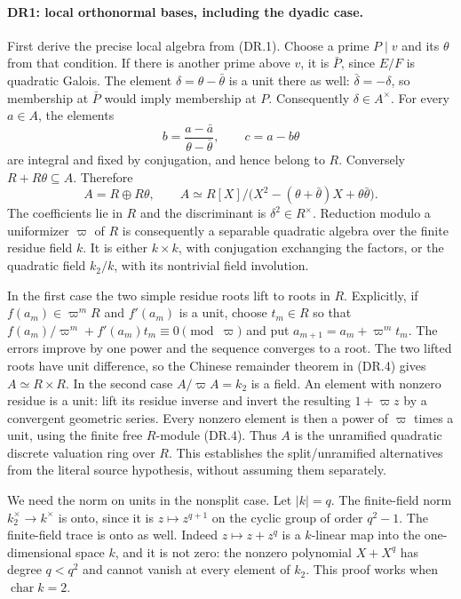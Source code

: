 \paragraph{DR1: local orthonormal bases, including the dyadic case.}
First derive the precise local algebra from (DR.1). Choose a prime
$P\mid v$ and its $\theta$ from that condition. If there is another
prime above $v$, it is $\bar P$, since $E/F$ is quadratic Galois.
The element $\delta=\theta-\bar\theta$ is a unit there as well:
$\bar\delta=-\delta$, so membership at $\bar P$ would imply
membership at $P$. Consequently $\delta\in A^\times$.
For every $a\in A$, the elements
\[
 b=\frac{a-\bar a}{\theta-\bar\theta},\qquad
 c=a-b\theta                                             \tag{DR.3}
\]
are integral and fixed by conjugation, and hence belong to $R$.
Conversely $R+R\theta\subseteq A$. Therefore
\[
 A=R\oplus R\theta,
 \qquad A\simeq R[X]/\bigl(X^2-(\theta+\bar\theta)X
                                  +\theta\bar\theta\bigr).
 \tag{DR.4}
\]
The coefficients lie in $R$ and the discriminant is
$\delta^2\in R^\times$. Reduction modulo a uniformizer $\varpi$
of $R$ is consequently a separable quadratic algebra over the finite
residue field $k$. It is either $k\times k$, with conjugation
exchanging the factors, or the quadratic field $k_2/k$, with its
nontrivial field involution.

In the first case the two simple residue roots lift to roots in $R$.
Explicitly, if $f(a_m)\in\varpi^mR$ and $f'(a_m)$ is a unit, choose
$t_m\in R$ so that
$f(a_m)/\varpi^m+f'(a_m)t_m\equiv0\pmod\varpi$ and put
$a_{m+1}=a_m+\varpi^m t_m$. The errors improve by one power and
the sequence converges to a root. The two lifted roots have unit
difference, so the Chinese remainder theorem in (DR.4) gives
$A\simeq R\times R$. In the second case $A/\varpi A=k_2$ is a
field. An element with nonzero residue is a unit: lift its residue
inverse and invert the resulting $1+\varpi z$ by a convergent
geometric series. Every nonzero element is then a power of
$\varpi$ times a unit, using the finite free $R$-module (DR.4).
Thus $A$ is the unramified quadratic discrete valuation ring over $R$.
This establishes the split/unramified alternatives from the literal
source hypothesis, without assuming them separately.

We need the norm on units in the nonsplit case. Let $|k|=q$.
The finite-field norm $k_2^\times\to k^\times$ is onto, since
it is $z\mapsto z^{q+1}$ on the cyclic group of order $q^2-1$.
The finite-field trace is onto as well. Indeed
$z\mapsto z+z^q$ is a $k$-linear map into the one-dimensional
space $k$, and it is not zero: the nonzero polynomial $X+X^q$
has degree $q<q^2$ and cannot vanish at every element of $k_2$.
This proof works when $\operatorname{char}k=2$.

